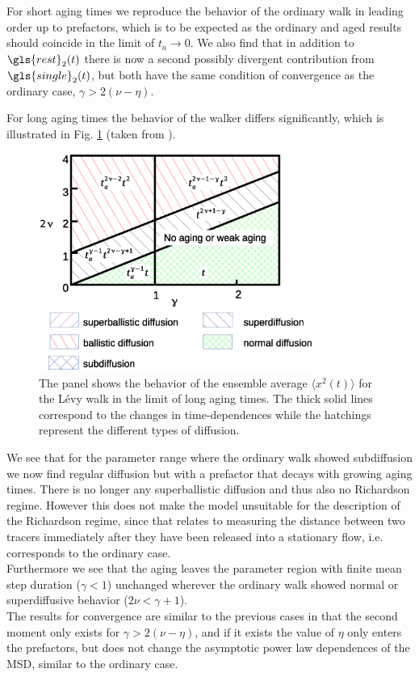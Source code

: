 For short aging times we reproduce the behavior of the ordinary walk in leading order up to prefactors, which is to be expected as the ordinary and aged results should coincide in the limit of $t_a \to 0$. We also find that in addition to $\gls{rest}_2(t)$ there is now a second possibly divergent contribution from $\gls{single}_2(t)$, but both have the same condition of convergence as the ordinary case, $\gamma > 2(\nu-\eta)$. 

For long aging times the behavior of the walker differs significantly, which is illustrated in Fig. \ref{fig:resultsMSDaged} (taken from 
\cite{bothe}). 
%
\begin{figure}[h!]
\begin{center}
\includegraphics[width=90mm]{pics/resultsMSDaged.eps}
\caption{The panel shows the behavior of the ensemble average $\langle x^2(t) \rangle$ for the L\'evy walk in the limit of long aging times. The thick solid lines correspond to the changes in time-dependences while the hatchings represent the different types of diffusion.
\label{fig:resultsMSDaged} }
\end{center}
\end{figure} 
%
We see that for the parameter range where the ordinary walk showed subdiffusion we now find regular diffusion but with a prefactor that decays with growing aging times. There is no longer any superballistic diffusion and thus also no Richardson regime. However this does not make the model unsuitable for the description of the Richardson regime, since that relates to measuring the distance between two tracers immediately after they have been released into a stationary flow, i.e. corresponds to the ordinary case.\\ Furthermore we see that the aging leaves the parameter region with finite mean step duration ($\gamma<1$) unchanged wherever the ordinary walk showed normal or superdiffusive behavior ($2\nu < \gamma +1$).\\
The results for convergence are similar to the previous cases in that the second moment only exists for $\gamma>2(\nu-\eta)$, and if it exists the value of $\eta$ only enters the prefactors, but does not change the asymptotic power law dependences of the MSD, similar to the ordinary case.

